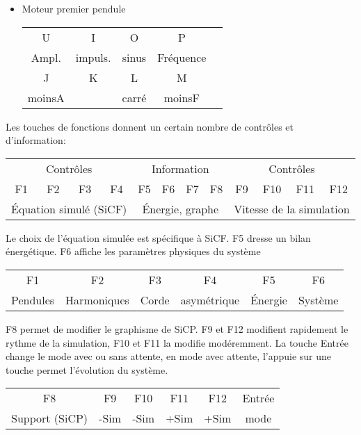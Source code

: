 \begin{itemize}[leftmargin=2cm, label=, itemsep=0pt]%
\item Moteur premier pendule

\hspace{9cm}
\begin{tabular}{ccccc}
\sf U &\sf I &\sf O &\sf P \\
 Ampl. & impuls. & sinus & Fréquence \\
\sf J &\sf K &\sf L &\sf M \\
 moinsA &  & carré & moinsF \\
\end{tabular}
%
\end{itemize}
Les touches de fonctions donnent un certain nombre de contrôles et d'information:
%
\begin{center}
\begin{tabular}{ccccc ccccc cc}
\multicolumn{4}{|c|}{Contrôles} & \multicolumn{4}{c}{Information} & \multicolumn{4}{|c|}{Contrôles}\\
\sf F1 &\sf F2 &\sf F3 &\sf F4 &\sf F5 &\sf F6 &\sf F7 &\sf F8 &\sf F9 &\sf F10 &\sf F11 &\sf F12 \\
\multicolumn{4}{|c|}{Équation simulé (SiCF)} & \multicolumn{4}{c}{Énergie, graphe} & \multicolumn{4}{|c|}{Vitesse de la simulation}\\
\end{tabular}
\end{center}
%
Le choix de l'équation simulée est spécifique à SiCF. {\sf F5} dresse un bilan énergétique. {\sf F6} affiche les paramètres physiques du système
\begin{center}
\begin{tabular}{cccccc}
\sf F1 &\sf F2 &\sf F3 &\sf F4 &\sf F5 &\sf F6\\
Pendules & Harmoniques & Corde & asymétrique & Énergie & Système \\
\end{tabular}
\end{center}
%
{\sf F8} permet de modifier  le graphisme de SiCP. {\sf F9} et {\sf F12} modifient rapidement le rythme de la simulation, {\sf F10} et {\sf F11} la modifie modéremment. La touche {\sf Entrée} change le mode avec ou sans attente, en mode avec attente, l'appuie sur une touche permet l'évolution du système.
\begin{center}
\begin{tabular}{cccccc}
\sf F8 &\sf F9 &\sf F10 &\sf F11 &\sf F12 & \sf Entrée \\
Support (SiCP) & -Sim & -Sim & +Sim & +Sim & mode\\
\end{tabular}
\end{center}
%
